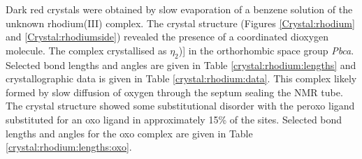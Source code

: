 Dark red crystals were obtained by slow evaporation of a benzene solution of the unknown rhodium(III) complex.  The crystal structure (Figures \ref{Crystal:rhodium} and \ref{Crystal:rhodiumside}) revealed the presence of a coordinated dioxygen molecule.  The complex crystallised as \ce{[Rh(tBu-xantphos)Cl(}$\eta_2$)] in the orthorhombic space group \emph{Pbca}.  Selected bond lengths and angles are given in Table \ref{crystal:rhodium:lengths} and crystallographic data is given in Table \ref{crystal:rhodium:data}.  This complex likely formed by slow diffusion of oxygen through the septum sealing the NMR tube.  The crystal structure showed some substitutional disorder with the peroxo ligand substituted for an oxo ligand in approximately 15\% of the sites.  Selected bond lengths and angles for the oxo complex are given in Table \ref{crystal:rhodium:lengths:oxo}.



